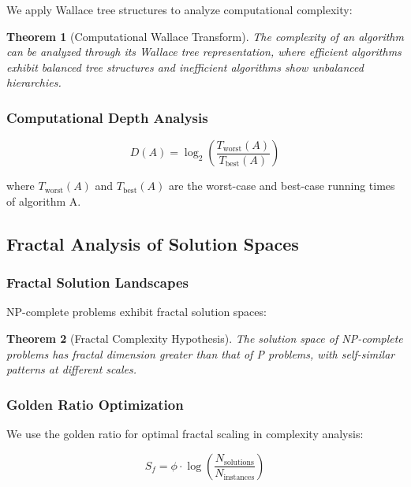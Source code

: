 \documentclass[12pt]{article}
\newtheorem{theorem}{Theorem}
\begin{document}
We apply Wallace tree structures to analyze computational complexity:

\begin{theorem}[Computational Wallace Transform]
The complexity of an algorithm can be analyzed through its Wallace tree representation, where efficient algorithms exhibit balanced tree structures and inefficient algorithms show unbalanced hierarchies.
\end{theorem}

\subsubsection{Computational Depth Analysis}

\begin{equation}
D(A) = \log_2 \left( \frac{T_{\text{worst}}(A)}{T_{\text{best}}(A)} \right)
\end{equation}

where $T_{\text{worst}}(A)$ and $T_{\text{best}}(A)$ are the worst-case and best-case running times of algorithm A.

\subsection{Fractal Analysis of Solution Spaces}

\subsubsection{Fractal Solution Landscapes}

NP-complete problems exhibit fractal solution spaces:

\begin{theorem}[Fractal Complexity Hypothesis]
The solution space of NP-complete problems has fractal dimension greater than that of P problems, with self-similar patterns at different scales.
\end{theorem}

\subsubsection{Golden Ratio Optimization}

We use the golden ratio for optimal fractal scaling in complexity analysis:

\begin{equation}
S_f = \phi \cdot \log \left( \frac{N_{\text{solutions}}}{N_{\text{instances}}} \right)
\end{equation}
\end{document}
